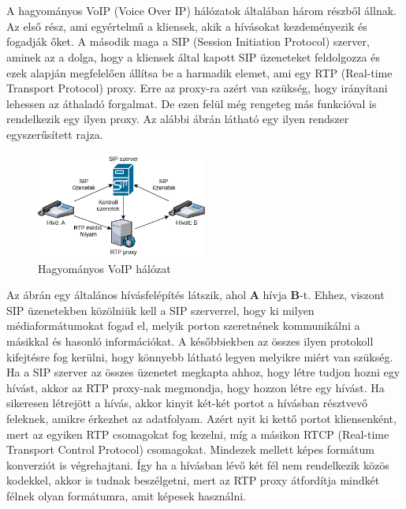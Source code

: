 \chapter{\bevezetes}
A hagyományos VoIP (Voice Over IP) hálózatok általában három részből állnak.
Az első rész, ami egyértelmű a kliensek, akik a hívásokat kezdeményezik és 
fogadják őket. A második maga a SIP (Session Initiation Protocol) szerver, aminek
az a dolga, hogy a kliensek által kapott SIP üzeneteket feldolgozza és ezek alapján
megfelelően állítsa be a harmadik elemet, ami egy RTP (Real-time Transport Protocol) 
proxy. Erre az proxy-ra azért van szükség, hogy irányítani lehessen az áthaladó 
forgalmat. De ezen felül még rengeteg más funkcióval is rendelkezik egy ilyen
proxy. Az alábbi ábrán látható egy ilyen rendszer egyszerűsített rajza.

\begin{figure}[!ht]
	\centering
	\includegraphics[width=0.5\textwidth, keepaspectratio]{figures/traditional_voip.png}
	\caption{Hagyományos VoIP hálózat}
	\label{fig:HVSpaces}
\end{figure}

Az ábrán egy általános hívásfelépítés látszik, ahol \textbf{A} hívja \textbf{B}-t. 
Ehhez, viszont SIP üzenetekben közölniük kell a SIP szerverrel, hogy ki milyen 
médiaformátumokat fogad el, melyik porton szeretnének kommunikálni a másikkal és 
hasonló információkat. A későbbiekben az összes ilyen protokoll kifejtésre fog
kerülni, hogy könnyebb látható legyen melyikre miért van szükség. Ha a SIP szerver
az összes üzenetet megkapta ahhoz, hogy létre tudjon hozni egy hívást, akkor az 
RTP proxy-nak megmondja, hogy hozzon létre egy hívást. Ha sikeresen létrejött a 
hívás, akkor kinyit két-két portot a hívásban résztvevő feleknek, amikre érkezhet
az adatfolyam. Azért nyit ki kettő portot kliensenként, mert az egyiken RTP 
csomagokat fog kezelni, míg a másikon RTCP (Real-time Transport Control Protocol) 
csomagokat. Mindezek mellett képes formátum konverziót is végrehajtani. Így ha 
a hívásban lévő két fél nem rendelkezik közös kodekkel, akkor is tudnak 
beszélgetni, mert az RTP proxy átfordítja mindkét félnek olyan formátumra, amit 
képesek használni.

